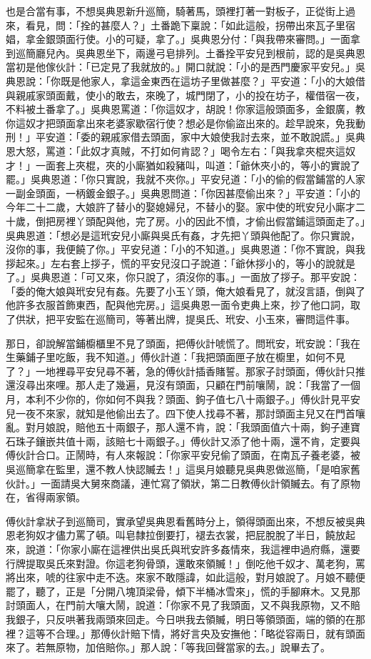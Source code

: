 也是合當有事，不想吳典恩新升巡簡，騎著馬，頭裡打著一對板子，正從街上過來，看見，問：「拴的甚麼人？」土番跪下稟說：「如此這般，拐帶出來瓦子里宿娼，拿金銀頭面行使。小的可疑，拿了。」吳典恩分付：「與我帶來審問。」一面拿到巡簡廳兒內。吳典恩坐下，兩邊弓皂排列。土番拴平安兒到根前，認的是吳典恩當初是他傢伙計：「已定見了我就放的。」開口就說：「小的是西門慶家平安兒。」吳典恩說：「你既是他家人，拿這金東西在這坊子里做甚麼？」平安道：「小的大娘借與親戚家頭面戴，使小的敢去，來晚了，城門閉了，小的投在坊子，權借宿一夜，不料被土番拿了。」吳典恩罵道：「你這奴才，胡說！你家這般頭面多，金銀廣，教你這奴才把頭面拿出來老婆家歇宿行使？想必是你偷盜出來的。趁早說來，免我動刑！」平安道：「委的親戚家借去頭面，家中大娘使我討去來，並不敢說謊。」吳典恩大怒，罵道：「此奴才真賊，不打如何肯認？」喝令左右：「與我拿夾棍夾這奴才！」一面套上夾棍，夾的小廝猶如殺豬叫，叫道：「爺休夾小的，等小的實說了罷。」吳典恩道：「你只實說，我就不夾你。」平安兒道：「小的偷的假當鋪當的人家一副金頭面，一柄鍍金銀子。」吳典恩問道：「你因甚麼偷出來？」平安道：「小的今年二十二歲，大娘許了替小的娶媳婦兒，不替小的娶。家中使的玳安兒小廝才二十歲，倒把房裡丫頭配與他，完了房。小的因此不憤，才偷出假當鋪這頭面走了。」吳典恩道：「想必是這玳安兒小廝與吳氏有姦，才先把丫頭與他配了。你只實說，沒你的事，我便饒了你。」平安兒道：「小的不知道。」吳典恩道：「你不實說，與我拶起來。」左右套上拶子，慌的平安兒沒口子說道：「爺休拶小的，等小的說就是了。」吳典恩道：「可又來，你只說了，須沒你的事。」一面放了拶子。那平安說：「委的俺大娘與玳安兒有姦。先要了小玉丫頭，俺大娘看見了，就沒言語，倒與了他許多衣服首飾東西，配與他完房。」這吳典恩一面令吏典上來，抄了他口詞，取了供狀，把平安監在巡簡司，等著出牌，提吳氏、玳安、小玉來，審問這件事。

那日，卻說解當鋪櫥櫃里不見了頭面，把傅伙計唬慌了。問玳安，玳安說：「我在生藥鋪子里吃飯，我不知道。」傅伙計道：「我把頭面匣子放在櫥里，如何不見了？」一地裡尋平安兒尋不著，急的傅伙計插香賭誓。那家子討頭面，傅伙計只推還沒尋出來哩。那人走了幾遍，見沒有頭面，只顧在門前嚷鬧，說：「我當了一個月，本利不少你的，你如何不與我？頭面、鉤子值七八十兩銀子。」傅伙計見平安兒一夜不來家，就知是他偷出去了。四下使人找尋不著，那討頭面主兒又在門首嚷亂。對月娘說，賠他五十兩銀子，那人還不肯，說：「我頭面值六十兩，鉤子連寶石珠子鑲嵌共值十兩，該賠七十兩銀子。」傅伙計又添了他十兩，還不肯，定要與傅伙計合口。正鬧時，有人來報說：「你家平安兒偷了頭面，在南瓦子養老婆，被吳巡簡拿在監里，還不教人快認贓去！」這吳月娘聽見吳典恩做巡簡，「是咱家舊伙計。」一面請吳大舅來商議，連忙寫了領狀，第二日教傅伙計領贓去。有了原物在，省得兩家領。

傅伙計拿狀子到巡簡司，實承望吳典恩看舊時分上，領得頭面出來，不想反被吳典恩老狗奴才儘力罵了頓。叫皂隸拉倒要打，褪去衣裳，把屁脫脫了半日，饒放起來，說道：「你家小廝在這裡供出吳氏與玳安許多姦情來，我這裡申過府縣，還要行牌提取吳氏來對證。你這老狗骨頭，還敢來領贓！」倒吃他千奴才、萬老狗，罵將出來，唬的往家中走不迭。來家不敢隱諱，如此這般，對月娘說了。月娘不聽便罷了，聽了，正是「分開八塊頂梁骨，傾下半桶冰雪來」，慌的手腳麻木。又見那討頭面人，在門前大嚷大鬧，說道：「你家不見了我頭面，又不與我原物，又不賠我銀子，只反哄著我兩頭來回走。今日哄我去領贓，明日等領頭面，端的領的在那裡？這等不合理。」那傅伙計賠下情，將好言央及安撫他：「略從容兩日，就有頭面來了。若無原物，加倍賠你。」那人說：「等我回聲當家的去。」說畢去了。

